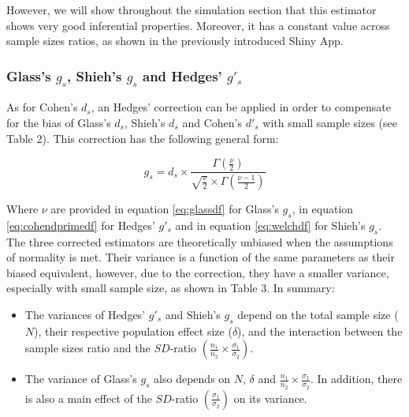 \documentclass[
  man,floatsintext]{apa6}
\providecommand{\tightlist}{%
  \setlength{\itemsep}{0pt}\setlength{\parskip}{0pt}}
\begin{document}
However, we will show throughout the simulation section that this estimator shows very good inferential properties. Moreover, it has a constant value across sample sizes ratios, as shown in the previously introduced Shiny App.

\hypertarget{glasss-g_s-shiehs-g_s-and-hedges-g_s}{%
\subsubsection{\texorpdfstring{Glass's \(g_s\), Shieh's \(g_s\) and Hedges' \(g'_s\)}{Glass's g\_s, Shieh's g\_s and Hedges' g'\_s}}\label{glasss-g_s-shiehs-g_s-and-hedges-g_s}}

As for Cohen's \(d_s\), an Hedges' correction can be applied in order to compensate for the bias of Glass's \(d_s\), Shieh's \(d_s\) and Cohen's \(d'_s\) with small sample sizes (see Table 2). This correction has the following general form:

\begin{equation} 
g_s = d_s \times \frac{\Gamma(\frac{\nu}{2})}{\sqrt{\frac{\nu}{2}} \times \Gamma(\frac{\nu-1}{2})}
\label{eq:Hedgesgs}
\end{equation}

Where \(\nu\) are provided in equation \ref{eq:glassdf} for Glass's \(g_s\), in equation \ref{eq:cohendprimedf} for Hedges' \(g'_s\) and in equation \ref{eq:welchdf} for Shieh's \(g_s\). The three corrected estimators are theoretically unbiased when the assumptions of normality is met. Their variance is a function of the same parameters as their biased equivalent, however, due to the correction, they have a smaller variance, especially with small sample size, as shown in Table 3. In summary:

\begin{itemize}
\tightlist
\item
  The variances of Hedges' \(g'_s\) and Shieh's \(g_s\) depend on the total sample size (\(N\)), their respective population effect size (\(\delta\)), and the interaction between the sample sizes ratio and the \(SD\)-ratio \(\left(\frac{n_1}{n_2}\times\frac{\sigma_1}{\sigma_2} \right)\).\\
\item
  The variance of Glass's \(g_s\) also depends on \(N\), \(\delta\) and \(\frac{n_1}{n_2}\times\frac{\sigma_1}{\sigma_2}\). In addition, there is also a main effect of the \(SD\)-ratio \(\left(\frac{\sigma_1}{\sigma_2} \right)\) on its variance.
\end{itemize}
\end{document}
